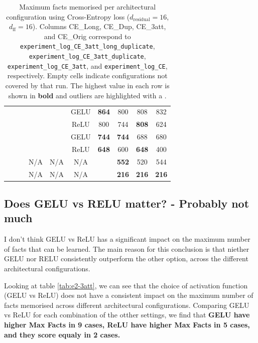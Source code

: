 \documentclass[11pt,a4paper]{article}
\newcommand{\cmark}{{\color{green!70!black}\ding{51}}}
\newcommand{\xmark}{{\color{red}\ding{55}}}
\begin{document}
\begin{table}[h]
\begin{tabular}{@{}cccccc cccc@{}}
\hdashline[1pt/3pt]
\xmark & \cmark & \xmark & \xmark & \cmark & GELU & \textbf{864} & 800 & 808 & 832 \\
\xmark & \cmark & \xmark & \xmark & \cmark & ReLU & 800 & 744 & \textbf{808} & 624 \\
\xmark & \cmark & \xmark & \xmark & \xmark & GELU & \textbf{744} & \textbf{744} & 688 & 680 \\
\xmark & \cmark & \xmark & \xmark & \xmark & ReLU & \textbf{648} & 600 & \textbf{648} & 400 \\
\midrule
\xmark & \xmark & \cmark & N/A & N/A & N/A &  & \textbf{552} & 520 & 544 \\
\xmark & \xmark & \xmark & N/A & N/A & N/A &  & \textbf{216} & \textbf{216} & \textbf{216} \\
\bottomrule
\end{tabular}
\caption{Maximum facts memorised per architectural configuration using Cross-Entropy loss ($d_{\text{residual}}=16$, $d_{\text{ff}}=16$). Columns CE\_Long, CE\_Dup, CE\_3att, and CE\_Orig correspond to \texttt{experiment\_log\_CE\_3att\_long\_duplicate}, \texttt{experiment\_log\_CE\_3att\_duplicate}, \texttt{experiment\_log\_CE\_3att}, and \texttt{experiment\_log\_CE}, respectively. Empty cells indicate configurations not covered by that run. The highest value in each row is shown in \textbf{bold} and outliers are highlighted with a .}
\label{tab:e2-ce}
\end{table}

\subsection{Does GELU vs RELU matter? - Probably not much}
I don't think GELU vs ReLU has a significant impact on the maximum number of facts that can be learned. The main reason for this conclusion is that niether GELU nor RELU consistently outperform the other option, across the different architectural configurations.

Looking at table \ref{tab:e2-3att}, we can see that the choice of activation function (GELU vs ReLU) does not have a consistent impact on the maximum number of facts memorised across different architectural configurations. Comparing GELU vs ReLU for each combination of the otther settings, we find that \textbf{GELU have higher Max Facts in 9 cases, ReLU have higher Max Facts in 5 cases, and they score equaly in 2 cases.}
\end{document}
